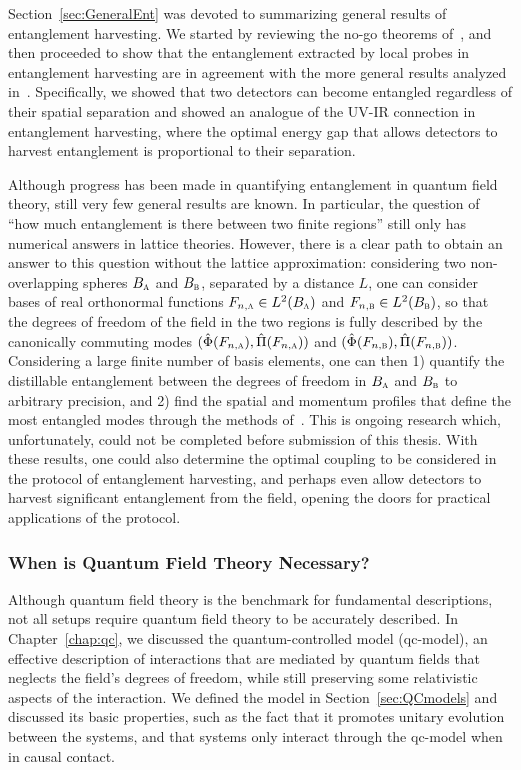 \documentclass[letterpaper,12pt,titlepage,oneside,final]{book}
\newcommand{\tc}[1]{\textsc{#1}}
\begin{document}
Section~\ref{sec:GeneralEnt} was devoted to summarizing general results of entanglement harvesting. We started by reviewing the no-go theorems of~\cite{nogo}, and then proceeded to show that the entanglement extracted by local probes in entanglement harvesting are in agreement with the more general results analyzed in~\cite{KlcoUVIR,KlcoEntStrQFTI,KlcoEntStrQFTII,KlcoEntAllDist}. Specifically, we showed that two detectors can become entangled regardless of their spatial separation and showed an analogue of the UV-IR connection in entanglement harvesting, where the optimal energy gap that allows detectors to harvest entanglement is proportional to their separation.

Although progress has been made in quantifying entanglement in quantum field theory, still very few general results are known. In particular, the question of ``how much entanglement is there between two finite regions'' still only has numerical answers in lattice theories. However, there is a clear path to obtain an answer to this question without the lattice approximation: considering two non-overlapping spheres $B_\tc{a}$ and $B_\tc{b}$, separated by a distance $L$, one can consider bases of real orthonormal functions $F_{n,\tc{a}}\in L^2(B_\tc{a})$ and $F_{n,\tc{b}}\in L^2(B_\tc{b})$, so that the degrees of freedom of the field in the two regions is fully described by the canonically commuting modes $(\hat{\Phi}(F_{n,\tc{a}}),\hat{\Pi}(F_{n,\tc{a}}))$ and $(\hat{\Phi}(F_{n,\tc{b}}),\hat{\Pi}(F_{n,\tc{b}}))$. Considering a large finite number of basis elements, one can then 1) quantify the distillable entanglement between the degrees of freedom in $B_\tc{a}$ and $B_\tc{b}$ to arbitrary precision, and 2) find the spatial and momentum profiles that define the most entangled modes through the methods of~\cite{KlcoUVIR,KlcoEntStrQFTI,KlcoEntStrQFTII}. This is ongoing research which, unfortunately, could not be completed before submission of this thesis. With these results, one could also determine the optimal coupling to be considered in the protocol of entanglement harvesting, and perhaps even allow detectors to harvest significant entanglement from the field, opening the doors for practical applications of the protocol.

\subsubsection*{When is Quantum Field Theory Necessary?}

Although quantum field theory is the benchmark for fundamental descriptions, not all setups require quantum field theory to be accurately described. In Chapter~\ref{chap:qc}, we discussed the quantum-controlled model (qc-model), an effective description of interactions that are mediated by quantum fields that neglects the field's degrees of freedom, while still preserving some relativistic aspects of the interaction. We defined the model in Section~\ref{sec:QCmodels} and discussed its basic properties, such as the fact that it promotes unitary evolution between the systems, and that systems only interact through the qc-model when in causal contact.
\end{document}
